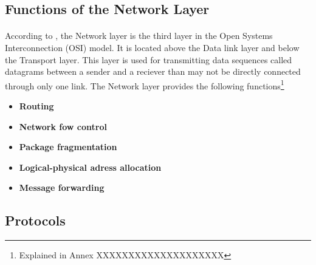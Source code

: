 %
%
%
%
%
%
%

\subsection{Functions of the Network Layer}
\paragraph{}According to \cite{X200}, the Network layer is the third layer in the Open Systems Interconnection (OSI) model. It is located above the Data link layer and below the Transport layer. This layer is used for transmitting data sequences called datagrams between a sender and a reciever than may not be directly connected through only one link. The Network layer provides the following functions\footnote{Explained in Annex XXXXXXXXXXXXXXXXXXXX}
\begin{itemize}
\item \textbf{Routing}
\item \textbf{Network fow control}
\item \textbf{Package fragmentation}
\item \textbf{Logical-physical adress allocation}
\item \textbf{Message forwarding}
\end{itemize}

\subsection{Protocols}
